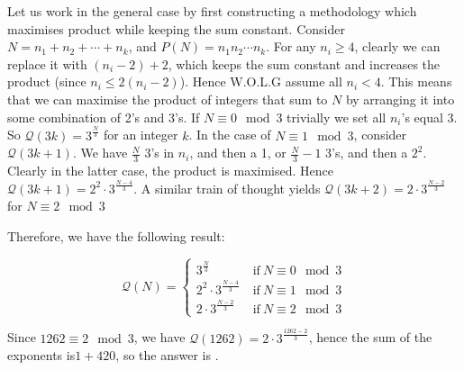 \documentclass[titlepage=true]{scrartcl}
\begin{document}
        \bigskip

        \begin{solution}\hfil\medskip

            Let us work in the general case by first constructing a methodology which maximises product while keeping the sum constant. Consider \(N=n_1+n_2+\cdots+n_k\), and \(P(N)=n_1n_2\cdots n_k\). For any \(n_i\geq 4\), clearly we can replace it with \((n_i-2)+2\), which keeps the sum constant and increases the product (since \(n_i\leq 2(n_i-2)\)). Hence W.O.L.G assume all \(n_i<4\). This means that we can maximise the product of integers that sum to \(N\) by arranging it into some combination of 2's and 3's. If \(N\equiv0\mod{3}\) trivially we set all \(n_i\)'s equal 3. So \(\mathcal{Q}(3k)=3^{\frac{N}{3}}\) for an integer \(k\). In the case of \(N\equiv 1\mod{3}\), consider\(\mathcal{Q}(3k+1)\). We have \(\frac{N}{3}\) 3's in \(n_i\), and then a 1, or \(\frac{N}{3}-1\) 3's, and then a \(2^2\). Clearly in the latter case, the product is maximised. Hence \(\mathcal{Q}(3k+1)=2^2\cdot3^{\frac{N-4}{3}}\). A similar train of thought yields \(\mathcal{Q}(3k+2)=2\cdot3^{\frac{N-2}{3}}\) for \(N\equiv 2\mod{3}\)\medskip
            
            Therefore, we have the following result:
            
            \begin{equation*}
                \mathcal{Q}(N)=
                \begin{cases}
                    3^{\frac{N}{3}}\ &\mathrm{if}\ N \equiv 0 \mod 3\\
                    2^2\cdot3^{\frac{N-4}{3}}\ &\mathrm{if}\ N \equiv 1 \mod 3\\
                    2\cdot3^{\frac{N-2}{3}}\ &\mathrm{if}\ N \equiv 2 \mod 3
                \end{cases}
            \end{equation*}
            
            Since \(1262\equiv 2\mod 3\), we have \(\mathcal{Q}(1262)=2\cdot3^{\frac{1262-2}{3}}\), hence the sum of the exponents is\(1+420\), so the answer is .
        \end{solution}\bigskip
\end{document}
